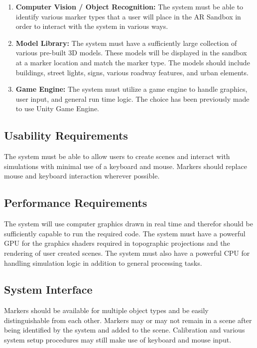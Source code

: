 \documentclass[letterpaper, 10pt, onecolumn, draftclsnofoot]{IEEEtran}
\begin{document}
\begin{enumerate}[\label={}]
        \item{\textbf{Computer Vision / Object Recognition:} The system must be able to identify various marker types that a user will place in the AR Sandbox in order to interact with the system in various ways.}
        
        \item{\textbf{Model Library:} The system must have a sufficiently large collection of various pre-built 3D models. These models will be displayed in the sandbox at a marker location and match the marker type. The models should include buildings, street lights, signs, various roadway features, and urban elements.}
        
        \item{\textbf{Game Engine:} The system must utilize a game engine to handle graphics, user input, and general run time logic. The choice has been previously made to use Unity Game Engine.}
        
    \end{enumerate}
        
    \subsection{\textbf{Usability Requirements}}
    The system must be able to allow users to create scenes and interact with simulations with minimal use of a keyboard and mouse. Markers should replace mouse and keyboard interaction wherever possible.
        
    \subsection{\textbf{Performance Requirements}}
    The system will use computer graphics drawn in real time and therefor should be sufficiently capable to run the required code. The system must have a powerful GPU for the graphics shaders required in topographic projections and the rendering of user created scenes. The system must also have a powerful CPU for handling simulation logic in addition to general processing tasks. 
        
    \subsection{\textbf{System Interface}}
    Markers should be available for multiple object types and be easily distinguishable from each other. Markers may or may not remain in a scene after being identified by the system and added to the scene. Calibration and various system setup procedures may still make use of keyboard and mouse input.
    
\end{document}
